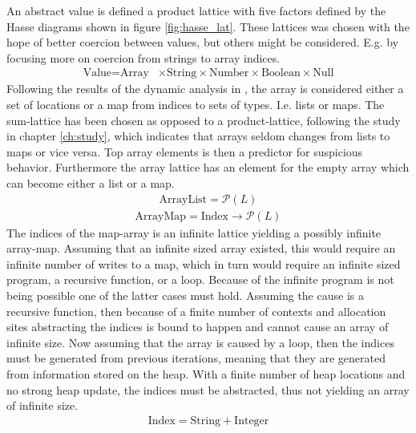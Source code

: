 An abstract value is defined a product lattice with five factors defined by the Hasse diagrams shown in figure \ref{fig:hasse_lat}. These lattices was chosen with the hope of better coercion between values, but others might be considered. E.g. by focusing more on coercion from strings to array indices.
\begin{align}
\text{Value} = \text{Array} & \times \text{String} \times \text{Number} \times \text{Boolean}  \times \text{Null}
\end{align}
Following the results of the dynamic analysis in \label{ch:study}, the array is considered either a set of locations or a map from indices to sets of types. I.e. lists or maps. The sum-lattice has been chosen as opposed to a product-lattice, following the study in chapter \ref{ch:study}, which indicates that arrays seldom changes from lists to maps or vice versa. Top array elements is then a predictor for suspicious behavior. Furthermore the array lattice has an element for the empty array which can become either a list or a map.  
\begin{align}
\text{ArrayList}= \mathcal{P}( L )
\end{align}
\begin{align}
\text{ArrayMap}=\text{Index} \rightarrow \mathcal{P}( L )
\end{align}
The indices of the map-array is an infinite lattice yielding a possibly infinite array-map. Assuming that an infinite sized array existed, this would require an infinite number of writes to a map, which in turn would require an infinite sized program, a recursive function, or a loop. Because of the infinite program is not being possible one of the latter cases must hold. Assuming the cause is a recursive function, then because of a finite number of contexts and allocation sites abstracting the indices is bound to happen and cannot cause an array of infinite size. Now assuming that the array is caused by a loop, then the indices must be generated from previous iterations, meaning that they are generated from information stored on the heap. With a finite number of heap locations and no strong heap update, the indices must be abstracted, thus not yielding an array of infinite size.
\begin{align}
\text{Index} = \text{String} + \text{Integer}
\end{align}
